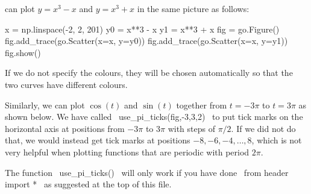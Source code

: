\documentclass[a4paper,10pt]{amsbook}
\begin{document}
\begin{secenum}
  can plot $y=x^3-x$ and $y=x^3+x$ in the same picture as follows:
  \begin{pcodeblock}
   x = np.linspace(-2, 2, 201)
   y0 = x**3 - x
   y1 = x**3 + x
   fig = go.Figure()
   fig.add_trace(go.Scatter(x=x, y=y0))
   fig.add_trace(go.Scatter(x=x, y=y1))
   fig.show()
  \end{pcodeblock}
  If we do not specify the colours, they will be chosen automatically
  so that the two curves have different colours.  
%
 \item\label{piticks} Similarly, we can plot $\cos(t)$ and $\sin(t)$
  together from $t=-3\pi$ to $t=3\pi$ as shown below.  We have 
  called \pcode~use_pi_ticks(fig,-3,3,2)~ to put tick marks on the
  horizontal axis at positions from $-3\pi$ to $3\pi$ with steps of
  $\pi/2$.  If we did not do that, we would instead get tick marks at
  positions $-8,-6,-4,\dotsc,8$, which is not very helpful when
  plotting functions that are periodic with period $2\pi$.

  The function \pcode~use_pi_ticks()~ will only work if you have done
  \pcode~from header import *~ as suggested at the top of this file.


\end{secenum}
\end{document}
